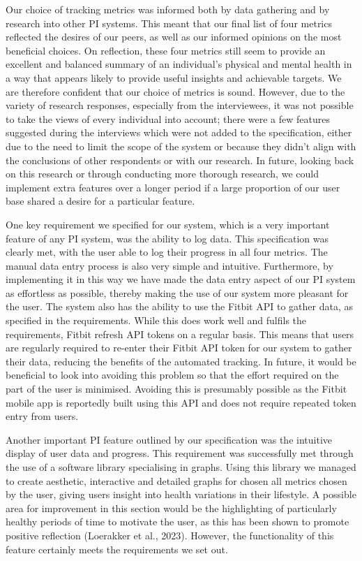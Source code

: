 \documentclass[11pt]{article}
\begin{document}
Our choice of tracking metrics was informed both by data gathering and by 
research into other PI systems. This meant that our final list of four metrics 
reflected the desires of our peers, as well as our informed opinions on the 
most beneficial choices. On reflection, these four metrics still seem to 
provide an excellent and balanced summary of an individual's physical and 
mental health in a way that appears likely to provide useful insights and 
achievable targets. We are therefore confident that our choice of metrics is 
sound. However, due to the variety of research responses, especially from the 
interviewees, it was not possible to take the views of every individual into 
account; there were a few features suggested during the interviews which were 
not added to the specification, either due to the need to limit the scope of 
the system or because they didn't align with the conclusions of other 
respondents or with our research. In future, looking back on this research or 
through conducting more thorough research, we could implement extra features 
over a longer period if a large proportion of our user base shared a desire for a particular feature.\par

One key requirement we specified for our system, which is a very important 
feature of any PI system, was the ability to log data. This specification was 
clearly met, with the user able to log their progress in all four metrics. The 
manual data entry process is also very simple and intuitive. 
Furthermore, by implementing it in this way we have made the data entry 
aspect of our PI system as effortless as possible, thereby making the use of 
our system more pleasant for the user. The system also has the ability to use 
the Fitbit API to gather data, as specified in the requirements. While this 
does work well and fulfils the requirements, Fitbit refresh API tokens on a 
regular basis. This means that users are regularly required to re-enter their 
Fitbit API token for our system to gather their data, reducing the benefits of 
the automated tracking. In future, it would be beneficial to look into 
avoiding this problem so that the effort required on the part of the user is 
minimised. Avoiding this is presumably possible as the Fitbit mobile app is 
reportedly built using this API and does not require repeated token entry from 
users.\par

Another important PI feature outlined by our specification was the 
intuitive display of user data and progress. This requirement was successfully 
met through the use of a software library specialising in graphs. Using this library
we managed to create aesthetic, interactive and detailed graphs for chosen all metrics chosen 
by the user, giving users insight into health variations in their lifestyle. A possible 
area for improvement in this section would be the highlighting of particularly 
healthy periods of time to motivate the user, as this has been shown to promote 
positive reflection (Loerakker et al., 2023). However, the functionality of 
this feature certainly meets the requirements we set out.\par
\end{document}
